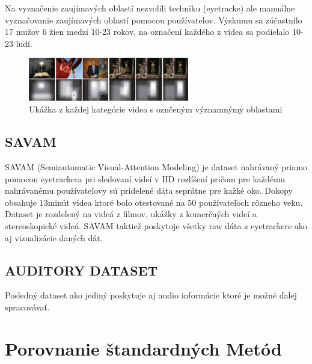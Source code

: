 Na vyznačenie zaujímavých oblastí nezvolili techniku (eyetracke) ale manuálne vyznačovanie zaujímavých oblastí pomocou používatelov. Výskumu sa zúčastnilo 17 mužov 6 žien medzi 10-23 rokov, na označení každého z videa sa podielalo 10-23 ludí.

\begin{figure}[H]
 \centering
 \includegraphics[width=7cm]{pics/rsd.png}
 \caption{Ukážka z každej kategórie videa s oznčeným významnýmy oblastami}
\end{figure}
\vspace{10mm}

\subsection{SAVAM}
SAVAM (Semiautomatic Visual-Attention Modeling) je dataset nahrávaný priamo pomocou eyetrackera pri sledovaní videí v HD rozlíšení pričom pre každému nahrávanému používateľovy sú pridelené dáta seprátne pre kažké oko. Dokopy obsahuje 13minút videa ktoré bolo otestované na 50 používateľoch rôzneho veku. Dataset je rozdelený na videá z filmov, ukážky z komerčných videí a stereoskopické videá. SAVAM taktiež poskytuje všetky raw dáta z eyetrackere ako aj vizualizácie daných dát\cite{savam}.

\subsection{AUDITORY DATASET}
Posledný dataset ako jediný poskytuje aj audio informácie ktoré je možné ďalej spracovávať.


\section{Porovnanie štandardných Metód}
